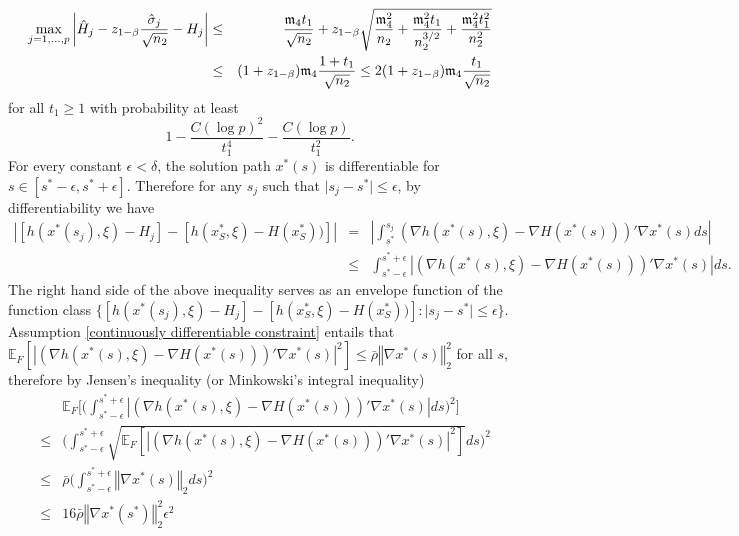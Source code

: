\documentclass[mnsc,blindrev]{informs4} %
\newcommand{\norm}[1]{\left \Vert #1 \right\Vert}
\newcommand{\abs}[1]{\left \vert #1 \right\vert}
\begin{document}
\begin{eqnarray}
    \notag\max_{j=1,\ldots,p}\abs{\hat H_j-z_{1-\beta}\frac{\hat\sigma_j}{\sqrt{n_2}}-H_j}&\leq& \frac{\mathfrak{m}_4t_1}{\sqrt{n_2}}+z_{1-\beta}\sqrt{\frac{\mathfrak{m}_4^2}{n_2}+\frac{\mathfrak{m}_4^2t_1}{n_2^{3/2}}+\frac{\mathfrak{m}_4^2t_1^2}{n_2^2}}\\
    &\leq& (1+z_{1-\beta})\mathfrak{m}_4\frac{1+t_1}{\sqrt{n_2}}\leq 2(1+z_{1-\beta})\mathfrak{m}_4\frac{t_1}{\sqrt{n_2}}\label{maximal deviation:sample mean adjusted by std}
\end{eqnarray}
for all $t_1\geq 1$ with probability at least
\begin{equation*}
1-\frac{C(\log p)^2}{t_1^4}-\frac{C(\log p)}{t_1^2}.
\end{equation*}
For every constant $\epsilon<\delta$, the solution path $x^*(s)$ is differentiable for $s\in [s^*-\epsilon,s^*+\epsilon]$. Therefore for any $s_j$ such that $\lvert s_j-s^*\rvert\leq \epsilon$, by differentiability we have
\begin{eqnarray*}
    \abs{[h(x^*(s_j),\xi)-H_j]-[h(x^*_S,\xi)-H(x^*_S))]}&=&\abs{\int_{s^*}^{s_j}(\nabla h(x^*(s),\xi)-\nabla H(x^*(s)))'\nabla x^*(s)ds}\\
    &\leq&\int_{s^*-\epsilon}^{s^*+\epsilon}\abs{(\nabla h(x^*(s),\xi)-\nabla H(x^*(s)))'\nabla x^*(s)}ds.
\end{eqnarray*}
The right hand side of the above inequality serves as an envelope function of the function class $\{[h(x^*(s_j),\xi)-H_j]-[h(x^*_S,\xi)-H(x^*_S))]:\lvert s_j-s^*\rvert\leq \epsilon\}$. Assumption \ref{continuously differentiable constraint} entails that $\mathbb E_F[\abs{(\nabla h(x^*(s),\xi)-\nabla H(x^*(s)))'\nabla x^*(s)}^2]\leq \bar{\rho}\norm{\nabla x^*(s)}_2^2$ for all $s$, therefore by Jensen's inequality (or Minkowski's integral inequality)
\begin{eqnarray*}
    &&\mathbb E_F\big[\big(\int_{s^*-\epsilon}^{s^*+\epsilon}\abs{(\nabla h(x^*(s),\xi)-\nabla H(x^*(s)))'\nabla x^*(s)}ds\big)^2\big]\\
    &\leq& \big(\int_{s^*-\epsilon}^{s^*+\epsilon}\sqrt{\mathbb E_F[\abs{(\nabla h(x^*(s),\xi)-\nabla H(x^*(s)))'\nabla x^*(s)}^2]}ds\big)^2\\
    &\leq&\bar{\rho}\big(\int_{s^*-\epsilon}^{s^*+\epsilon}\norm{\nabla x^*(s)}_2ds\big)^2\\
    &\leq &16\bar{\rho}\norm{\nabla x^*(s^*)}_2^2\epsilon^2
\end{eqnarray*}
\end{document}
